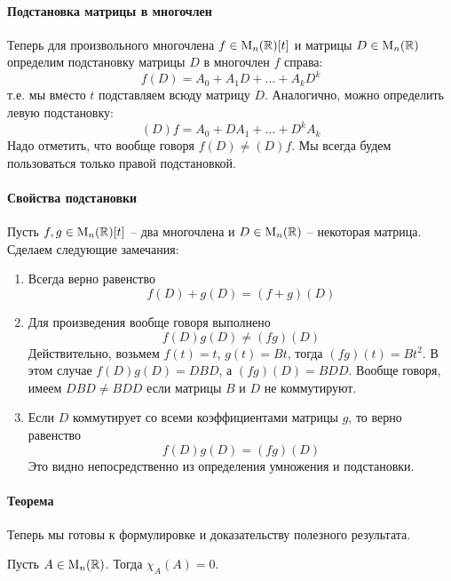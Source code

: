 \paragraph{Подстановка матрицы в многочлен} 

Теперь для произвольного многочлена $f\in\operatorname{M}_{n}(\mathbb R)[t]$ и матрицы $D\in\operatorname{M}_{n}(\mathbb R)$ определим подстановку матрицы $D$ в многочлен $f$ справа:
\[
f(D) = A_0 + A_1 D + \ldots + A_k D^k
\]
т.е. мы вместо $t$ подставляем всюду матрицу $D$.
Аналогично, можно определить левую подстановку:
\[
(D)f = A_0 + D A_1 + \ldots + D^k A_k
\]
Надо отметить, что вообще говоря $f(D)\neq (D)f$.
Мы всегда будем пользоваться только правой подстановкой.

\paragraph{Свойства подстановки}

Пусть $f,g\in\operatorname{M}_{n}(\mathbb R)[t]$ -- два многочлена и $D\in\operatorname{M}_{n}(\mathbb R)$ -- некоторая матрица.
Сделаем следующие замечания:
\begin{enumerate}
\item Всегда верно равенство
\[
f(D) + g(D) = (f + g)(D)
\]

\item Для произведения вообще говоря выполнено
\[
f(D)g(D)\neq (fg)(D)
\]
Действительно, возьмем $f(t) = t$, $g(t) = Bt$, тогда $(fg)(t) = Bt^2$.
В этом случае $f(D)g(D) = DBD$, а $(fg)(D) = BDD$.
Вообще говоря, имеем $DBD \neq BDD$ если матрицы $B$ и $D$ не коммутируют.

\item Если $D$ коммутирует со всеми коэффициентами матрицы $g$, то верно равенство
\[
f(D)g(D) = (fg)(D)
\]
Это видно непосредственно из определения умножения и подстановки.
\end{enumerate}

\paragraph{Теорема}

Теперь мы готовы к формулировке и доказательству полезного результата.

\begin{claim}
Пусть $A\in\operatorname{M}_{n}(\mathbb R)$.
Тогда $\chi_A(A) = 0$.
\end{claim}

